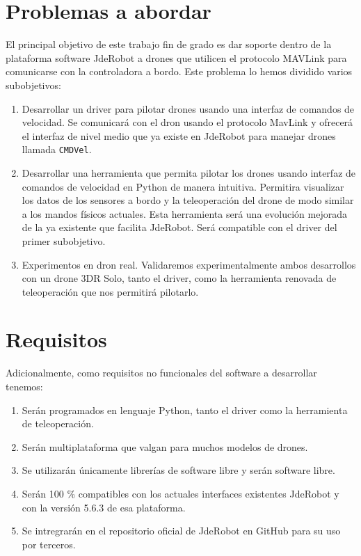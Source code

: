 \section{Problemas a abordar}

El principal objetivo de este trabajo fin de grado es dar soporte dentro de la plataforma software
JdeRobot a drones que utilicen el protocolo MAVLink para comunicarse con la controladora a bordo. Este problema lo hemos dividido varios subobjetivos:

\begin{enumerate}
\item Desarrollar un driver para pilotar drones usando una interfaz de comandos de velocidad. Se comunicará con el dron usando el protocolo MavLink y ofrecerá el interfaz de nivel medio que ya existe en JdeRobot para manejar drones llamada \texttt{CMDVel}.
\item Desarrollar una herramienta que permita pilotar los drones usando interfaz de comandos de velocidad en Python de manera intuitiva. Permitira visualizar los datos de los sensores a bordo y la teleoperación del drone de modo similar a los mandos físicos actuales. Esta herramienta será una evolución mejorada de la ya existente que facilita JdeRobot. Será compatible con el driver del primer subobjetivo.
\item Experimentos en dron real. Validaremos experimentalmente ambos desarrollos con un drone 3DR Solo, tanto el driver, como la herramienta renovada de teleoperación que nos permitirá pilotarlo.
\end{enumerate}


\section{Requisitos}

Adicionalmente, como requisitos no funcionales del software a desarrollar tenemos:

\begin{enumerate}
\item Serán programados en lenguaje Python, tanto el driver como la herramienta de teleoperación.
\item Serán multiplataforma que valgan para muchos modelos de drones.
\item Se utilizarán únicamente librerías de software libre y serán software libre.
\item Serán 100 \% compatibles con los actuales interfaces existentes JdeRobot y con la versión 5.6.3 de esa plataforma.
\item Se intregrarán en el repositorio oficial de JdeRobot en GitHub para su uso por terceros.

\end{enumerate}

